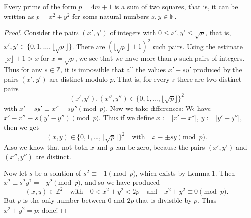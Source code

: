 \begin{proposition}
  \label{ch04.proposition1}
  Every prime of the form \(p = 4m + 1\) is a sum of two squares,
  that is, it can be written as \(p = x^2 + y^2\) for some natural numbers \(x,y \in \mathbb{N}\).
\end{proposition}
\begin{proof}
  Consider the pairs $(x', y')$ of integers with $0 \leq x', y' \leq \sqrt{p}$, that is,
  $x', y' \in \{0, 1, \dots, \lfloor \sqrt{p} \rfloor\}$.
  There are $(\lfloor \sqrt{p} \rfloor + 1)^2$ such pairs.
  Using the estimate $\lfloor x \rfloor + 1 > x$ for $x = \sqrt{p}$, we see that we have more
  than $p$ such pairs of integers. Thus for any $s \in \mathbb{Z}$, it is impossible that all
  the values $x' - sy'$ produced by the pairs $(x', y')$ are distinct modulo $p$. That is, for
  every $s$ there are two distinct pairs
  \[
  (x', y'), (x'', y'') \in \{0, 1, \dots, \lfloor \sqrt{p} \rfloor\}^2
  \]
  with $x' - sy' \equiv x'' - sy'' \pmod{p}$. Now we take differences:
  We have $x' - x'' \equiv s(y' - y'') \pmod{p}$. Thus if we define
  $x := |x' - x''|$, $y := |y' - y''|$, then we get
  \[
  (x, y) \in
  \{0, 1, \dots, \lfloor \sqrt{p} \rfloor\}^2 \quad \text{with} \quad x \equiv \pm sy \pmod{p}.
  \]
  Also we know that not both $x$ and $y$ can be zero, because the pairs $(x', y')$ and $(x'', y'')$
  are distinct.

  Now let $s$ be a solution of $s^2 \equiv -1 \pmod{p}$, which exists by Lemma 1.
  Then $x^2 \equiv s^2 y^2 = -y^2 \pmod{p}$, and so we have produced
  \[
  (x, y) \in
  \mathbb{Z}^2 \quad \text{with} \quad
  0 < x^2 + y^2 < 2p \quad \text{and} \quad x^2 + y^2 \equiv 0 \pmod{p}.
  \]
  But $p$ is the only number between $0$ and $2p$ that is divisible by $p$.
  Thus $x^2 + y^2 = p$: done!
\end{proof}

